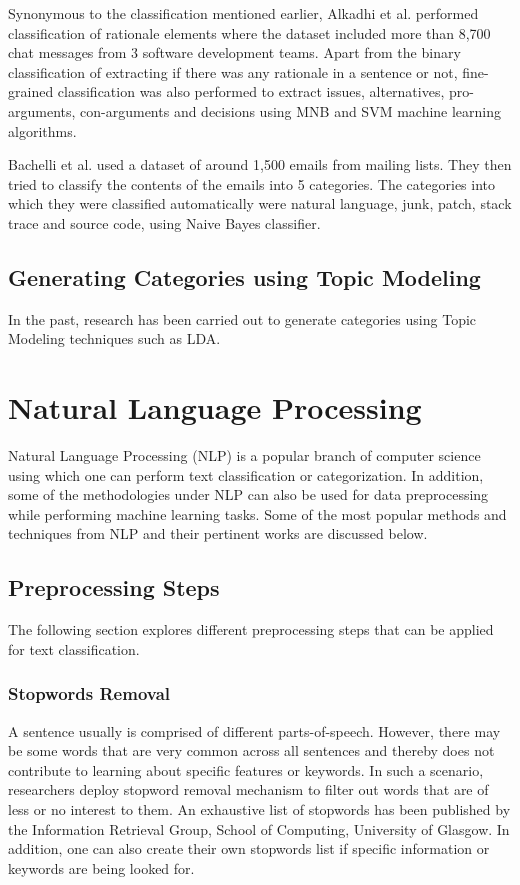 \documentclass[a4paper,12pt,twoside]{report}
\begin{document}
Synonymous to the classification mentioned earlier, Alkadhi et al. performed classification of rationale elements where the dataset included more than 8,700 chat messages from 3 software development teams. Apart from the binary classification of extracting if there was any rationale in a sentence or not, fine-grained classification was also performed to extract issues, alternatives, pro-arguments, con-arguments and decisions using MNB and SVM machine learning algorithms. 

Bachelli et al. used a dataset of around 1,500 emails from mailing lists. They then tried to classify the contents of the emails into 5 categories. The categories into which they were classified automatically were natural language, junk, patch, stack trace and source code, using Naive Bayes classifier. 

\subsection{Generating Categories using Topic Modeling}
In the past, research has been carried out to generate categories using Topic Modeling techniques such as LDA. 

\section{Natural Language Processing}

Natural Language Processing (NLP) is a popular branch of computer science using which one can perform text classification or categorization. In addition, some of the methodologies under NLP can also be used for data preprocessing while performing machine learning tasks. Some of the most popular methods and techniques from NLP and their pertinent works are discussed below. 

\subsection{Preprocessing Steps}
The following section explores different preprocessing steps that can be applied for text classification. 

\subsubsection{Stopwords Removal}
A sentence usually is comprised of different parts-of-speech. However, there may be some words that are very common across all sentences and thereby does not contribute to learning about specific features or keywords. In such a scenario, researchers deploy stopword removal mechanism to filter out words that are of less or no interest to them. An exhaustive list of stopwords has been published by the Information Retrieval Group, School of Computing, University of Glasgow. In addition, one can also create their own stopwords list if specific information or keywords are being looked for. 
\end{document}

